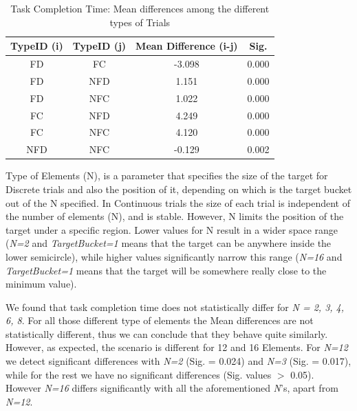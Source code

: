 \begin{table}[H]
\centering
\begin{tabular}{c || c || c || c}
TypeID (i) & TypeID (j) & Mean Difference (i-j) & Sig. \\
\hline \hline
FD      &   FC      &   -3.098      & 0.000 \\
FD      &   NFD     &   1.151       & 0.000 \\
FD      &   NFC     &   1.022       & 0.000 \\
FC      &   NFD     &   4.249       & 0.000 \\
FC      &   NFC     &   4.120       & 0.000 \\
NFD     &   NFC     &   -0.129      & 0.002
\end{tabular}
\caption{Task Completion Time: Mean differences among the different types of Trials}
\label{tab:totaTimeAnova}
\end{table}

Type of Elements (N), is a parameter that specifies the size of the target for Discrete trials and also the position of it, depending on which is the target bucket out of the N specified. In Continuous trials the size of each trial is independent of the number of elements (N), and is stable. However, N limits the position of the target under a specific region. 
Lower values for N result in a wider space range (\emph{N=2} and \emph{TargetBucket=1} means that the target can be anywhere inside the lower semicircle), while higher values significantly narrow this range (\emph{N=16} and \emph{TargetBucket=1} means that the target will be somewhere really close to the minimum value).

We found that task completion time does not statistically differ for \emph{N = 2, 3, 4, 6, 8}. For all those different type of elements the Mean differences are not statistically different, thus we can conclude that they behave quite similarly. However, as expected, the scenario is different for 12 and 16 Elements. For \emph{N=12} we detect significant differences with \emph{N=2} (Sig. = 0.024) and \emph{N=3} (Sig. = 0.017), while for the rest we have no significant differences (Sig. values $>$ 0.05). However \emph{N=16} differs significantly with all the aforementioned \emph{N}'s, apart from \emph{N=12}. 

